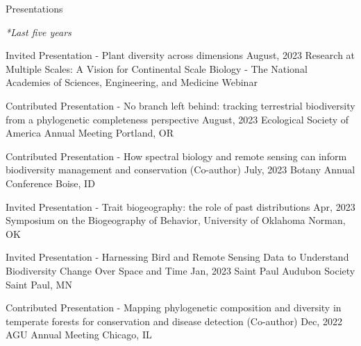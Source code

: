 \documentclass{resume} %
\begin{document}


\begin{rSection}{Presentations} 
\normalfont 

\em{*Last five years}

\begin{sSubsection}{Invited Presentation - Plant diversity across dimensions}{ \hfill }{August, 2023}{ Research at Multiple Scales: A Vision for Continental Scale Biology - The National Academies of Sciences, Engineering, and Medicine }{Webinar}
\end{sSubsection}

\begin{sSubsection}{Contributed Presentation - No branch left behind: tracking terrestrial biodiversity from a phylogenetic completeness perspective}{ \hfill }{August, 2023}{ Ecological Society of America Annual Meeting }{Portland, OR}
\end{sSubsection}

\begin{sSubsection}{Contributed Presentation - How spectral biology and remote sensing can inform biodiversity management and conservation}{ (Co-author) }{July, 2023}{ Botany Annual Conference }{Boise, ID}
\end{sSubsection}

\begin{sSubsection}{Invited Presentation - Trait biogeography: the role of past distributions}{ \hfill }{Apr, 2023}{ Symposium on the Biogeography of Behavior, University of Oklahoma }{Norman, OK}
\end{sSubsection}

\begin{sSubsection}{Invited Presentation - Harnessing Bird and Remote Sensing Data to Understand Biodiversity Change Over Space and Time}{ \hfill }{Jan, 2023}{ Saint Paul Audubon Society }{Saint Paul, MN}
\end{sSubsection}

\begin{sSubsection}{Contributed Presentation - Mapping phylogenetic composition and diversity in temperate forests for conservation and disease detection}{ (Co-author) }{Dec, 2022}{ AGU Annual Meeting }{Chicago, IL}
\end{sSubsection}


\end{rSection}
\end{document}
